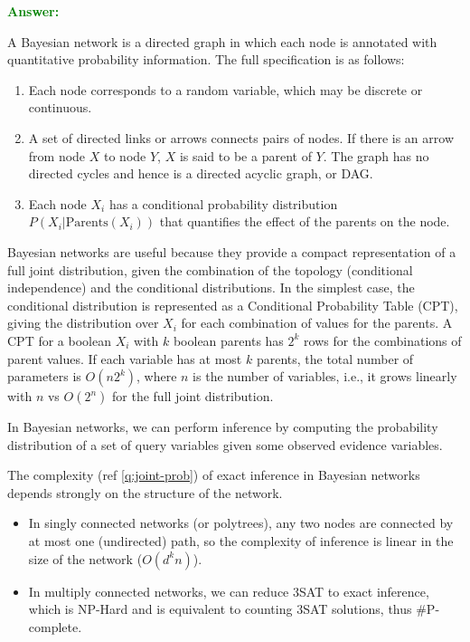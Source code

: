 \documentclass[12pt]{article}
\begin{document}
\begin{enumerate}[label=\textbf{U.\arabic*}]
          \textcolor{green}{\textbf{Answer:}}

          A Bayesian network is a directed graph in which each node is annotated with quantitative probability information. The full specification is as follows:
          \begin{enumerate}
              \item Each node corresponds to a random variable, which may be discrete or continuous.
              \item A set of directed links or arrows connects pairs of nodes. If there is an arrow from node $X$ to node $Y$, $X$ is said to be a parent of $Y$. The graph has no directed cycles and hence is a directed acyclic graph, or DAG.
              \item Each node $X_i$ has a conditional probability distribution $P(X_i|\text{Parents}(X_i))$ that quantifies the effect of the parents on the node.
          \end{enumerate}

          Bayesian networks are useful because they provide a compact representation of a full joint distribution, given the combination of the topology (conditional independence) and the conditional distributions. In the simplest case, the conditional distribution is represented as a Conditional Probability Table (CPT), giving the distribution over $X_i$ for each combination of values for the parents. A CPT for a boolean $X_i$ with $k$ boolean parents has $2^k$ rows for the combinations of parent values. If each variable has at most $k$ parents, the total number of parameters is $O(n2^k)$, where $n$ is the number of variables, i.e., it grows linearly with $n$ vs $O(2^n)$ for the full joint distribution.

          In Bayesian networks, we can perform inference by computing the probability distribution of a set of query variables given some observed evidence variables.

          The complexity (ref \ref{q:joint-prob}) of exact inference in Bayesian networks depends strongly on the structure of the network.
          \begin{itemize}
              \item In singly connected networks (or polytrees), any two nodes are connected by at most one (undirected) path, so the complexity of inference is linear in the size of the network ($O(d^kn)$).
              \item In multiply connected networks, we can reduce 3SAT to exact inference, which is NP-Hard and is equivalent to counting 3SAT solutions, thus \#P-complete.
          \end{itemize}


\end{enumerate}
\end{document}
